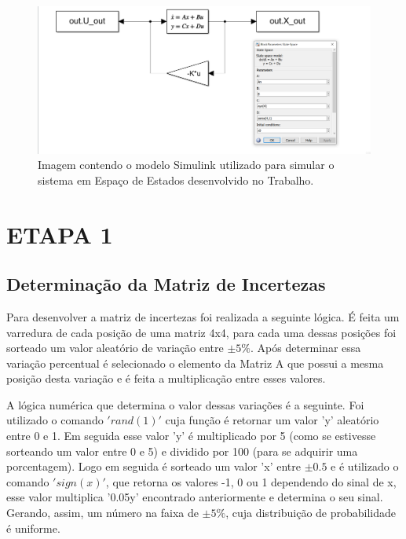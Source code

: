 \documentclass[a4paper,12pt]{article}
\begin{document}
\begin{figure}[!h]
  \vspace{3cm}
  \hspace*{0cm} 
  \includegraphics[width=15 cm]{ModeloSimulink.png}
  \centering
  \caption{Imagem contendo o modelo Simulink utilizado para simular o sistema em Espaço de Estados desenvolvido no Trabalho.}
  \label{Simulink}
\end{figure}

\clearpage

\section{ETAPA 1}
\subsection{Determinação da Matriz de Incertezas}
\label{subsec:matrizincerteza}

Para desenvolver a matriz de incertezas foi realizada a seguinte lógica. É feita um varredura de cada posição de uma matriz 4x4, para cada uma dessas posições foi sorteado um valor aleatório de variação entre $\pm 5\%$. Após determinar essa variação percentual é selecionado o elemento da Matriz A que possui a mesma posição desta variação e é feita a multiplicação entre esses valores. 

A lógica numérica que determina o valor dessas variações é a seguinte. Foi utilizado o comando $'rand(1)'$ cuja função é retornar um valor 'y' aleatório entre 0 e 1. Em seguida esse valor 'y' é multiplicado por 5 (como se estivesse sorteando um valor entre 0 e 5) e dividido por 100 (para se adquirir uma porcentagem). Logo em seguida é sorteado um valor 'x' entre $\pm 0.5$ e é utilizado o comando $'sign(x)'$, que retorna os valores -1, 0 ou 1 dependendo do sinal de x, esse valor multiplica '0.05y' encontrado anteriormente e determina o seu sinal. Gerando, assim, um número na faixa de $\pm 5\%$, cuja distribuição de probabilidade é uniforme. 
\end{document}
